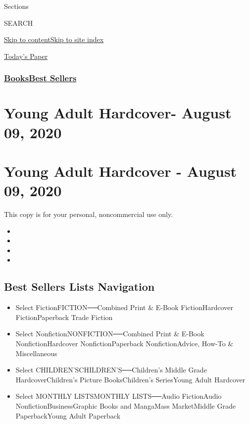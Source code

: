Sections

SEARCH

\protect\hyperlink{site-content}{Skip to
content}\protect\hyperlink{site-index}{Skip to site index}

\href{https://myaccount.nytimes3xbfgragh.onion/auth/login?response_type=cookie\&client_id=vi}{}

\href{https://www.nytimes3xbfgragh.onion/section/todayspaper}{Today's
Paper}

\hypertarget{booksbest-sellers}{%
\subsubsection{\texorpdfstring{\href{/section/books/}{Books}\textbar{}\href{/books/best-sellers/}{Best
Sellers}}{Books\textbar{}Best Sellers}}\label{booksbest-sellers}}

\hypertarget{young-adult-hardcover--august-09-2020}{%
\section{Young Adult Hardcover- August 09,
2020}\label{young-adult-hardcover--august-09-2020}}

\hypertarget{young-adult-hardcover---august-09-2020}{%
\section{Young Adult Hardcover - August 09,
2020}\label{young-adult-hardcover---august-09-2020}}

This copy is for your personal, noncommercial use only.

\begin{itemize}
\item
\item
\item
\item
\end{itemize}

\hypertarget{best-sellers-lists-navigation}{%
\subsection{Best Sellers Lists
Navigation}\label{best-sellers-lists-navigation}}

\begin{itemize}
\tightlist
\item
  Select FictionFICTION──Combined Print \& E-Book FictionHardcover
  FictionPaperback Trade Fiction
\item
  Select NonfictionNONFICTION──Combined Print \& E-Book
  NonfictionHardcover NonfictionPaperback NonfictionAdvice, How-To \&
  Miscellaneous
\item
  Select CHILDREN'SCHILDREN'S──Children's Middle Grade
  HardcoverChildren's Picture BooksChildren's SeriesYoung Adult
  Hardcover
\item
  Select MONTHLY LISTSMONTHLY LISTS──Audio FictionAudio
  NonfictionBusinessGraphic Books and MangaMass MarketMiddle Grade
  PaperbackYoung Adult Paperback
\end{itemize}

